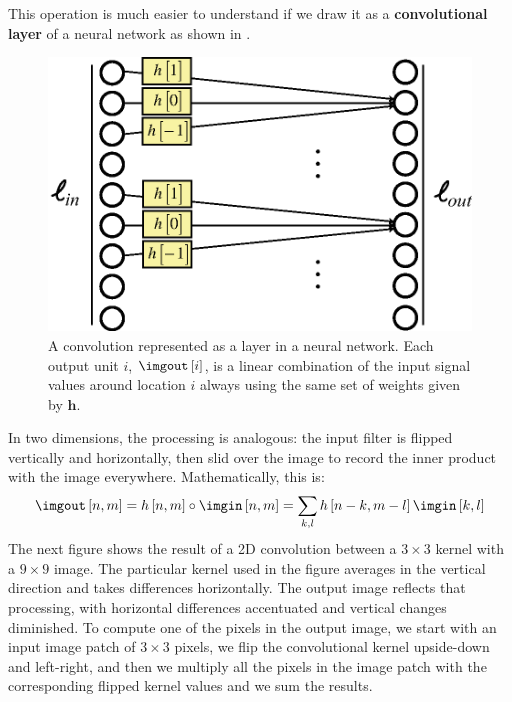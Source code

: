 This operation is much easier to understand if we draw it as a {\bf convolutional layer} of a neural network as shown in \fig{\ref{fig:conv_filter2_nn}}.

\begin{figure}[h!]
	\centerline{
		\includegraphics[width=.5\linewidth]{figures/linear_image_filtering/conv_filter2.eps}
	}
	\caption{A convolution represented as a layer in a neural network. Each output unit $i$, $\imgout \left[i \right]$, is a linear combination of the input signal values around location $i$ always using the same set of weights given by $\mathbf{h}$.}
	\label{fig:conv_filter2_nn}
\end{figure}


In two dimensions, the processing is analogous:
the input filter is flipped vertically and horizontally, then slid over the
image to record the inner product with the image everywhere.
Mathematically, this is:
\begin{equation}
	\imgout \left[n,m\right] = h \left[n,m\right] \circ \imgin \left[n,m\right] =  \sum_{k,l}h \left[n-k,m-l \right] \imgin \left[k,l \right]
	\label{eq:2dconv}
\end{equation}
The next figure shows the result of a 2D convolution between a $3 \times 3$ kernel with a $9 \times 9$ image. The particular kernel used in the figure averages in the
vertical direction and takes differences horizontally. The output
image reflects that processing, with horizontal differences
accentuated and vertical changes diminished. To compute one of the pixels in the output image, we start with an input image patch of $3 \times 3$ pixels, we flip the convolutional kernel upside-down and left-right, and then we multiply all the pixels in the image patch with the corresponding flipped kernel values and we sum the results.

